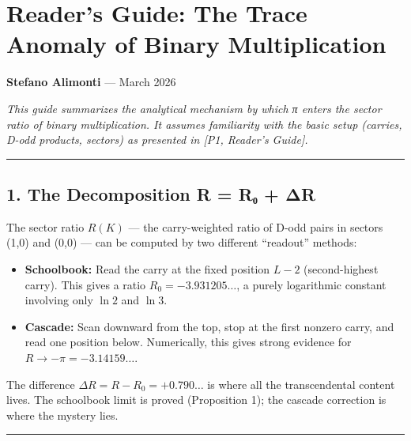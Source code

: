 \documentclass[
  11pt,
]{article}
\author{Stefano Alimonti --- stefalimonti@gmail.com}
\date{March 2026}
\providecommand{\tightlist}{%
  \setlength{\itemsep}{0pt}\setlength{\parskip}{0pt}}
\begin{document}
{
\hypersetup{linkcolor=black}
\setcounter{tocdepth}{2}
\tableofcontents
}
\section{Reader's Guide: The Trace Anomaly of Binary
Multiplication}\label{readers-guide-the-trace-anomaly-of-binary-multiplication}

\textbf{Stefano Alimonti} --- March 2026

\emph{This guide summarizes the analytical mechanism by which π enters the
sector ratio of binary multiplication. It assumes familiarity with the basic
setup (carries, D-odd products, sectors) as presented in {[}P1, Reader's
Guide{]}.}

\begin{center}\rule{0.5\linewidth}{0.5pt}\end{center}

\newpage

\subsection{1. The Decomposition R = R₀ +
ΔR}\label{the-decomposition-r-rux2080-ux3b4r}

The sector ratio \(R(K)\) --- the carry-weighted ratio of D-odd pairs in sectors
(1,0) and (0,0) --- can be computed by two different ``readout'' methods:

\begin{itemize}
\tightlist
\item
  \textbf{Schoolbook:} Read the carry at the fixed position \(L - 2\)
  (second-highest carry). This gives a ratio \(R_0 = -3.931205\ldots\), a purely
  logarithmic constant involving only \(\ln 2\) and \(\ln 3\).
\item
  \textbf{Cascade:} Scan downward from the top, stop at the first nonzero carry,
  and read one position below. Numerically, this gives strong evidence for
  \(R \to -\pi = -3.14159\ldots\).
\end{itemize}

The difference \(\Delta R = R - R_0 = +0.790\ldots\) is where all the
transcendental content lives. The schoolbook limit is proved (Proposition 1);
the cascade correction is where the mystery lies.

\begin{center}\rule{0.5\linewidth}{0.5pt}\end{center}

\newpage
\end{document}
